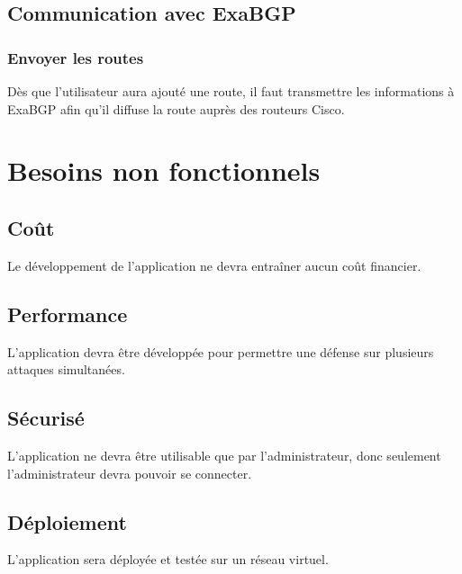 \subsection{Communication avec ExaBGP}

\subsubsection{Envoyer les routes}
Dès que l'utilisateur aura ajouté une route, il faut transmettre les informations à ExaBGP afin qu'il diffuse la route auprès des routeurs Cisco.
\newpage




\section{Besoins non fonctionnels}

\subsection{Coût}
Le développement de l'application ne devra entraîner aucun coût financier.

\subsection{Performance}
L'application devra être développée pour permettre une défense sur plusieurs attaques simultanées. %

\subsection{Sécurisé}
L’application ne devra être utilisable que par l'administrateur, donc seulement l'administrateur devra pouvoir se connecter.

\subsection{Déploiement}
L'application sera déployée et testée sur un réseau virtuel.

